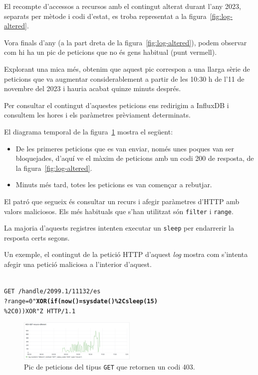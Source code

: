 \documentclass[lettersize,journal]{IEEEtran}
\begin{document}
El recompte d'accessos a recursos amb el contingut alterat durant l'any 2023, separats per mètode i codi d'estat, es troba representat a la figura~\ref{fig:log-altered}.

Vora finals d'any (a la part dreta de la figura~\ref{fig:log-altered}), podem observar com hi ha un pic de peticions que no és gens habitual (punt vermell).

Explorant una mica més, obtenim que aquest pic correspon a una llarga sèrie de peticions que va augmentar considerablement a partir de les 10:30 h de l'11 de novembre del 2023 i hauria acabat quinze minuts després.

Per consultar el contingut d'aquestes peticions ens redirigim a InfluxDB i consultem les hores i els paràmetres prèviament determinats.

El diagrama temporal de la figura~\ref{fig:possible-attacks} mostra el següent:

\begin{itemize}
    \item De les primeres peticions que es van enviar, només unes poques van ser bloquejades, d'aquí ve el màxim de peticions amb un codi 200 de resposta, de la figura~\ref{fig:log-altered}.
    \item Minuts més tard, totes les peticions es van començar a rebutjar.
\end{itemize}
El patró que segueix és consultar un recurs i afegir paràmetres d'HTTP amb valors maliciosos.
Els més habituals que s'han utilitzat són \texttt{filter} i \texttt{range}.

La majoria d'aquests registres intenten executar un \texttt{sleep} per endarrerir la resposta certs segons.

Un exemple, el contingut de la petició HTTP d'aquest \textit{log} mostra com s'intenta afegir una petició maliciosa a l'interior d'aquest.

\noindent \\
\texttt{GET /handle/2099.1/11132/es\\?range=0"\textbf{XOR(if(now()=sysdate()\%2Csleep(15)}\\\%2C0))XOR"Z HTTP/1.1}

\begin{figure}[!t]
    \centerline{\includegraphics[width=0.5\textwidth]{figures/possible-attacks-403}}
    \caption{Pic de peticions del tipus \texttt{GET} que retornen un codi 403.}\label{fig:possible-attacks}
\end{figure}
\end{document}
